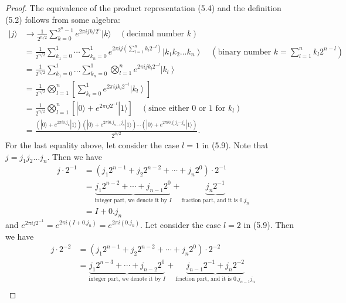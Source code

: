 \begin{proof}
    The equivalence of the product representation (5.4) and the definition (5.2) follows from some algebra:
\begin{align}
|j\rangle & \rightarrow \frac{1}{2^{n / 2}} \sum_{k=0}^{2^{n}-1} e^{2 \pi i j k / 2^{n}}|k\rangle \quad (\text{decimal number } k) \tag{5.5}\\
& =\frac{1}{2^{n / 2}} \sum_{k_{1}=0}^{1} \cdots \sum_{k_{n}=0}^{1} e^{2 \pi i j\left(\sum_{l=1}^{n} k_{l} 2^{-l}\right)}\left|k_{1} k_{2} \ldots k_{n}\right\rangle  \quad (\text{binary number } k = \sum_{l=1}^n k_l 2^{n-l})\tag{5.6}\\
& =\frac{1}{2^{n / 2}} \sum_{k_{1}=0}^{1} \ldots \sum_{k_{n}=0}^{1} \bigotimes_{l=1}^{n} e^{2 \pi i j k_{l} 2^{-l}}\left|k_{l}\right\rangle  \tag{5.7}\\
& =\frac{1}{2^{n / 2}} \bigotimes_{l=1}^{n}\left[\sum_{k_{l}=0}^{1} e^{2 \pi i j k_{l} 2^{-l}}\left|k_{l}\right\rangle\right]  \tag{5.8}\\
& =\frac{1}{2^{n / 2}} \bigotimes_{l=1}^{n}\left[|0\rangle+e^{2 \pi i j 2^{-l}}|1\rangle\right]  \quad (\text{since either 0 or 1 for } k_{l})  \tag{5.9}\\
& =\frac{\left(|0\rangle+e^{2 \pi i 0. j_{n}}|1\rangle\right)\left(|0\rangle+e^{2 \pi i 0. j_{n-1} j_{n}}|1\rangle\right) \cdots\left(|0\rangle+e^{2 \pi i 0. j_{1} j_{2} \cdots j_{n}}|1\rangle\right)}{2^{n / 2}} . \tag{5.10}
\end{align} 
For the last equality above, let consider the case $l=1$ in (5.9). Note that $j=j_{1} j_{2} \ldots j_{n}.$ Then we have
\begin{align}
    j \cdot 2^{-1} 
    &=(j_{1} 2^{n-1}+j_{2} 2^{n-2}+\cdots+j_{n} 2^{0})\cdot 2^{-1}\\
    &=\underbrace{j_{1} 2^{n-2}+\cdots+j_{n-1} 2^{0}}_{\text{integer part, we denote it by $I$}} +\underbrace{j_{n} 2^{-1}}_{\text{fraction part, and it is $0.j_n$}} \\
    &=I + 0.j_n
\end{align}
and $e^{2 \pi i  j 2^{-1}}=e^{2 \pi i (I + 0.j_n)}=e^{2 \pi i (0.j_n)}$. Let consider the case $l=2$ in (5.9). Then we have
\begin{align}
    j \cdot 2^{-2} 
    &=(j_{1} 2^{n-1}+j_{2} 2^{n-2}+\cdots+j_{n} 2^{0})\cdot 2^{-2}\\
    &=\underbrace{j_{1} 2^{n-3}+\cdots+j_{n-2} 2^{0}}_{\text{integer part, we denote it by $I$}} +\underbrace{j_{n-1} 2^{-1}+ j_{n} 2^{-2}}_{\text{fraction part, and it is $0.j_{n-1}j_n$}} \\

\end{align}
\end{proof}

